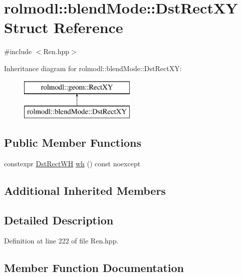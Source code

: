 \hypertarget{structrolmodl_1_1blend_mode_1_1_dst_rect_x_y}{}\section{rolmodl\+::blend\+Mode\+::Dst\+Rect\+XY Struct Reference}
\label{structrolmodl_1_1blend_mode_1_1_dst_rect_x_y}


{\ttfamily \#include $<$Ren.\+hpp$>$}

Inheritance diagram for rolmodl\+::blend\+Mode\+::Dst\+Rect\+XY\+:\begin{figure}[H]
\begin{center}
\leavevmode
\includegraphics[height=2.000000cm]{structrolmodl_1_1blend_mode_1_1_dst_rect_x_y}
\end{center}
\end{figure}
\subsection*{Public Member Functions}
\begin{DoxyCompactItemize}
\item 
constexpr \mbox{\hyperlink{structrolmodl_1_1blend_mode_1_1_dst_rect_w_h}{Dst\+Rect\+WH}} \mbox{\hyperlink{structrolmodl_1_1blend_mode_1_1_dst_rect_x_y_a398ec84f5aff0c324916adcd5438eacb}{wh}} () const noexcept
\end{DoxyCompactItemize}
\subsection*{Additional Inherited Members}


\subsection{Detailed Description}


Definition at line 222 of file Ren.\+hpp.



\subsection{Member Function Documentation}
\mbox{\label{structrolmodl_1_1blend_mode_1_1_dst_rect_x_y_a398ec84f5aff0c324916adcd5438eacb}} 
